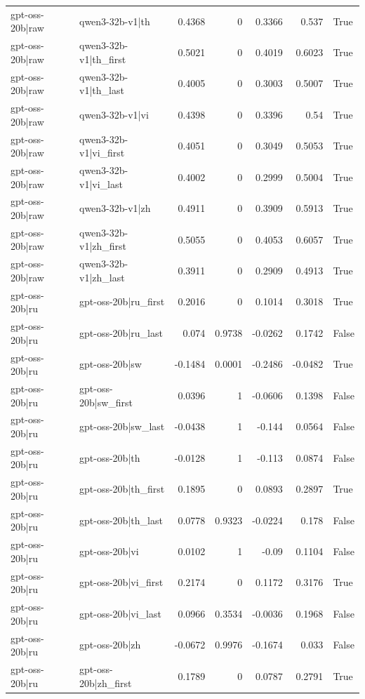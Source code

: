 \begin{table}
\begin{tabular}{l l r r r r l}
gpt-oss-20b|raw & qwen3-32b-v1|th & 0.4368 & 0 & 0.3366 & 0.537 & True \\
gpt-oss-20b|raw & qwen3-32b-v1|th_first & 0.5021 & 0 & 0.4019 & 0.6023 & True \\
gpt-oss-20b|raw & qwen3-32b-v1|th_last & 0.4005 & 0 & 0.3003 & 0.5007 & True \\
gpt-oss-20b|raw & qwen3-32b-v1|vi & 0.4398 & 0 & 0.3396 & 0.54 & True \\
gpt-oss-20b|raw & qwen3-32b-v1|vi_first & 0.4051 & 0 & 0.3049 & 0.5053 & True \\
gpt-oss-20b|raw & qwen3-32b-v1|vi_last & 0.4002 & 0 & 0.2999 & 0.5004 & True \\
gpt-oss-20b|raw & qwen3-32b-v1|zh & 0.4911 & 0 & 0.3909 & 0.5913 & True \\
gpt-oss-20b|raw & qwen3-32b-v1|zh_first & 0.5055 & 0 & 0.4053 & 0.6057 & True \\
gpt-oss-20b|raw & qwen3-32b-v1|zh_last & 0.3911 & 0 & 0.2909 & 0.4913 & True \\
gpt-oss-20b|ru & gpt-oss-20b|ru_first & 0.2016 & 0 & 0.1014 & 0.3018 & True \\
gpt-oss-20b|ru & gpt-oss-20b|ru_last & 0.074 & 0.9738 & -0.0262 & 0.1742 & False \\
gpt-oss-20b|ru & gpt-oss-20b|sw & -0.1484 & 0.0001 & -0.2486 & -0.0482 & True \\
gpt-oss-20b|ru & gpt-oss-20b|sw_first & 0.0396 & 1 & -0.0606 & 0.1398 & False \\
gpt-oss-20b|ru & gpt-oss-20b|sw_last & -0.0438 & 1 & -0.144 & 0.0564 & False \\
gpt-oss-20b|ru & gpt-oss-20b|th & -0.0128 & 1 & -0.113 & 0.0874 & False \\
gpt-oss-20b|ru & gpt-oss-20b|th_first & 0.1895 & 0 & 0.0893 & 0.2897 & True \\
gpt-oss-20b|ru & gpt-oss-20b|th_last & 0.0778 & 0.9323 & -0.0224 & 0.178 & False \\
gpt-oss-20b|ru & gpt-oss-20b|vi & 0.0102 & 1 & -0.09 & 0.1104 & False \\
gpt-oss-20b|ru & gpt-oss-20b|vi_first & 0.2174 & 0 & 0.1172 & 0.3176 & True \\
gpt-oss-20b|ru & gpt-oss-20b|vi_last & 0.0966 & 0.3534 & -0.0036 & 0.1968 & False \\
gpt-oss-20b|ru & gpt-oss-20b|zh & -0.0672 & 0.9976 & -0.1674 & 0.033 & False \\
gpt-oss-20b|ru & gpt-oss-20b|zh_first & 0.1789 & 0 & 0.0787 & 0.2791 & True \\

\end{tabular}
\end{table}
